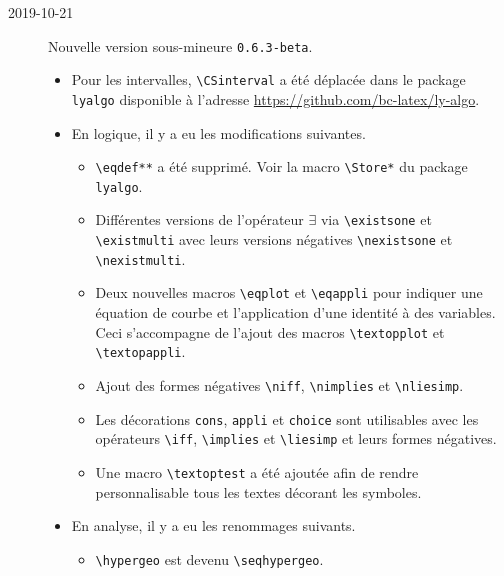 \documentclass[12pt,a4paper]{article}
\newcommand\env[1]{\texttt{#1}}
\newcommand\macro[1]{\env{\textbackslash{}#1}}
\theoremstyle{definition}
\begin{document}
\begin{description}
    \medskip
    \item[2019-10-21] Nouvelle version sous-mineure \verb+0.6.3-beta+.
    
    \begin{itemize}[itemsep=.5em]
        \item Pour les intervalles, \macro{CSinterval} a été déplacée dans le package \verb+lyalgo+ disponible à l'adresse \url{https://github.com/bc-latex/ly-algo}.
    
    
    
    
        \item En logique, il y a eu les modifications suivantes.
        \begin{itemize}[itemsep=.5em]
            \item \macro{eqdef**} a été supprimé. Voir la macro \macro{Store*} du package \verb+lyalgo+.
    
            \item Différentes versions de l'opérateur $\exists$ via \macro{existsone} et \macro{existmulti} avec leurs versions négatives \macro{nexistsone} et \macro{nexistmulti}.
    
            \item Deux nouvelles macros \macro{eqplot} et \macro{eqappli} pour indiquer une équation de courbe et l'application d'une identité à des variables. Ceci s'accompagne de l'ajout des macros \macro{textopplot} et \macro{textopappli}.
    
            \item Ajout des formes négatives \macro{niff}, \macro{nimplies} et \macro{nliesimp}.
    
            \item Les décorations \verb+cons+, \verb+appli+ et \verb+choice+ sont utilisables avec les opérateurs \macro{iff}, \macro{implies} et \macro{liesimp} et leurs formes négatives.
    
            \item Une macro \macro{textoptest} a été ajoutée afin de rendre personnalisable tous les textes décorant les symboles.
        \end{itemize}
    
    
    
    
        \item En analyse, il y a eu les renommages suivants.
        \begin{itemize}[itemsep=.5em]
            \item \macro{hypergeo} est devenu \macro{seqhypergeo}.
    

\end{itemize}
\end{itemize}
\end{description}
\end{document}
